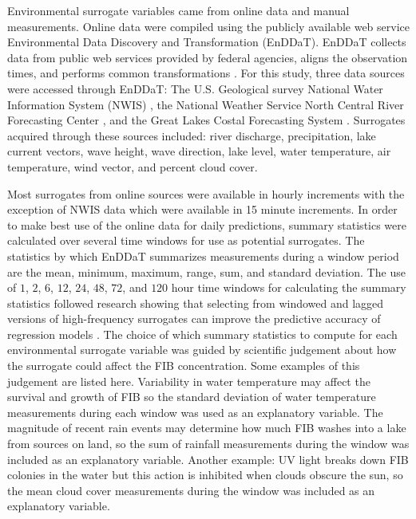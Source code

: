 \documentclass[authoryear,review, 12pt]{elsarticle}
\begin{document}
Environmental surrogate variables came from 
online data and manual measurements. Online data were compiled using the publicly available web service 
Environmental Data Discovery and Transformation (EnDDaT). EnDDaT collects data from  public web services provided by federal agencies, aligns the observation times, and performs common transformations \citep{EnDDaT-2014}. For this study, three data sources were accessed through EnDDaT: The U.S. Geological survey National Water
Information System (NWIS) \citep{NWIS}, the National Weather Service
North Central River Forecasting Center \citep{NCRFC}, and the Great Lakes
Costal Forecasting System \citep{Schwab-Bedford-1999}. Surrogates
acquired through these sources included: river discharge, precipitation,
lake current vectors, wave height, wave direction, lake level, water
temperature, air temperature, wind vector, and percent cloud cover.

Most surrogates from online sources were available in hourly increments
with the exception of NWIS data which were available in 15 minute
increments. In order to make best use of the online data for
daily predictions, summary statistics were calculated over
several time windows for use as potential surrogates. The statistics by which EnDDaT summarizes measurements during a window period are the mean, minimum, maximum, range, sum, and
standard deviation. The use of $1$, $2$,
$6$, $12$, $24$, $48$, $72$, and $120$ hour time windows for calculating the summary
statistics followed research showing that selecting from windowed
and lagged versions of high-frequency surrogates can improve the
predictive accuracy of regression models
\citep{Cyterski-Zhang-White-Molina-Wolfe-Parmar-Zepp-2012}. The choice of which
summary statistics to compute for each environmental surrogate variable was guided by
scientific judgement about how the surrogate could affect the FIB
concentration. Some examples of this judgement are listed here. Variability in water
temperature may affect the survival and growth of FIB so the standard deviation of water temperature
measurements during each window was used as an explanatory variable. The magnitude of
recent rain events may determine how much FIB washes into a
lake from sources on land, so the sum of
rainfall measurements during the window was included as an explanatory variable.
Another example: UV light breaks down FIB colonies in the water but this action is inhibited when clouds obscure the sun, so the mean cloud cover measurements during
the window was included as an explanatory variable.
\end{document}
